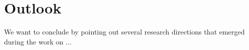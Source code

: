 
 


\chapter{Outlook}\label{cha:outlook}

We want to conclude by pointing out several research directions that emerged
during the work on ... %

